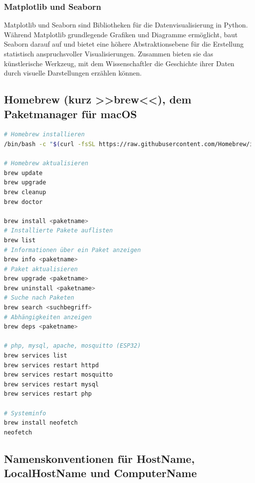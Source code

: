 \documentclass{vorlage-design-main}
\begin{document}
\subsubsection{Matplotlib und Seaborn}\label{matplotlib-und-seaborn}

Matplotlib und Seaborn sind Bibliotheken für die Datenvisualisierung in
Python. Während Matplotlib grundlegende Grafiken und Diagramme
ermöglicht, baut Seaborn darauf auf und bietet eine höhere
Abstraktionsebene für die Erstellung statistisch anspruchsvoller
Visualisierungen. Zusammen bieten sie das künstlerische Werkzeug, mit
dem Wissenschaftler die Geschichte ihrer Daten durch visuelle
Darstellungen erzählen können.

\subsection{Homebrew (kurz >>brew<<), dem Paketmanager für
macOS}\label{homebrew-kurz-brew-dem-paketmanager-fuer-macos}

\begin{lstlisting}[language=bash]
# Homebrew installieren
/bin/bash -c "$(curl -fsSL https://raw.githubusercontent.com/Homebrew/install/HEAD/install.sh)"

# Homebrew aktualisieren
brew update
brew upgrade
brew cleanup
brew doctor

brew install <paketname>
# Installierte Pakete auflisten
brew list
# Informationen über ein Paket anzeigen
brew info <paketname>
# Paket aktualisieren
brew upgrade <paketname>
brew uninstall <paketname>
# Suche nach Paketen
brew search <suchbegriff>
# Abhängigkeiten anzeigen
brew deps <paketname>

# php, mysql, apache, mosquitto (ESP32)
brew services list
brew services restart httpd
brew services restart mosquitto
brew services restart mysql
brew services restart php

# Systeminfo
brew install neofetch
neofetch
\end{lstlisting}

\subsection{Namenskonventionen für HostName, LocalHostName und
ComputerName}\label{namenskonventionen-fuer-hostname-localhostname-und-computername}
\end{document}
